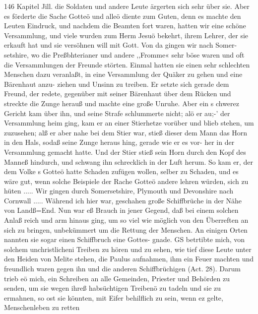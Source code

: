 146 Kapitel Jill.
die Soldaten und andere Leute ärgerten sich sehr über sie. Aber
es förderte die Sache Gotteö und alleö diente zum Guten, denn
es machte den Leuten Eindruck, und nachdem die Beamten fort
waren, hatten wir eine schöne Versammlung, und viele wurden
zum Herm Jesuö bekehrt, ihrem Lehrer, der sie erkauft hat und
sie versöhnen will mit Gott. Von da gingen wir nach Somer-
setshire, wo die Preßbhterianer und andere ,,Fromme« sehr böse
waren und oft die Versammlungen der Freunde störten. Einmal
hatten sie einen sehr schlechten Menschen dazu veranlaßt, in eine
Versammlung der Quäker zu gehen und eine Bärenhaut anzu-
ziehen und Unsinn zu treiben. Er setzte sich gerade dem Freund,
der redete, gegenüber mit seiner Bärenhaut über dem Rücken
und streckte die Zunge herauß und machte eine große Unruhe.
Aber ein s chwerez Gericht kam über ihn, und seine Strafe schlummerte
nicht; alö er au;-’ der Versammlung heim ging, kam er an einer
Stierhetze vorüber und blieb stehen, um zuzusehen; alß er aber
nahe bei dem Stier war, stieß dieser dem Mann das Horn in
den Hals, sodaß seine Zunge heraus hing, gerade wie er es vor-
her in der Versammlung gemacht hatte. Und der Stier stieß
sein Horn durch den Kopf des Manneß hindurch, und schwang
ihn schrecklich in der Luft herum. So kam er, der dem Volke s
Gotteö hatte Schaden zufügen wollen, selber zu Schaden, und
es wäre gut, wenn solche Beispiele der Rache Gotteö andere lehren
würden, sich zu hüten .....
Wir gingen durch Somersetshire, Plymouth und Devonshire
nach Cornwall ..... Während ich hier war, geschahen große
Schiffbrüche in der Nähe von Landß=End. Nun war eß Brauch
in jener Gegend, daß bei einem solchen Anlaß reich und arm
hinaus ging, um so viel wie möglich von den Überreften an
sich zu bringen, unbekümmert um die Rettung der Menschen. An
einigen Orten nannten sie sogar einen Schiffbruch eine Gottes-
gnade. GS betrtibte mich, von solchem unchristlicheni Treiben zu
hören und zu sehen, wie tief diese Leute unter den Heiden von
Melite stehen, die Paulus aufnahmen, ihm ein Feuer machten
und freundlich waren gegen ihn und die anderen Schiffbrüchigen
(Act. 28). Darum trieb eö mich, ein Schreiben an alle Gemeinden,
Priester und Behörden zu senden, um sie wegen ihreß habsüchtigen
Treibenö zu tadeln und sie zu ermahnen, so ost sie könnten, mit
Eifer behilflich zu sein, wenn ez gelte, Menschenleben zu retten


